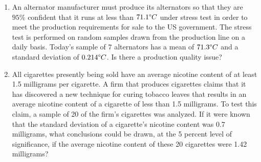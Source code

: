 \documentclass{book}
\begin{document}
\begin{enumerate}
    \item An alternator manufacturer must produce its alternators so that they are $95\%$ confident that it runs at less than $71.1\degree C$ under stress test in order to meet the production requirements for sale to the US government. The stress test is performed on random samples drawn from the production line on a daily basis. Today’s sample of $7$ alternators has a mean of $71.3\degree C$ and a standard deviation of $0.214\degree C$. Is there a production quality issue?
    \item All cigarettes presently being sold have an average nicotine content of at least 1.5 milligrams per cigarette. A firm that produces cigarettes claims that it has discovered a new technique for curing tobacco leaves that results in an average nicotine content of a cigarette of less than 1.5 milligrams. To test this claim, a sample of 20 of the firm's cigarettes was analyzed. If it were known that the standard deviation of a cigarette's nicotine content was 0.7 milligrams, what conclusions could be drawn, at the 5 percent level of significance, if the average nicotine content of these 20 cigarettes were 1.42 milligrams?
\end{enumerate}
\end{document}
